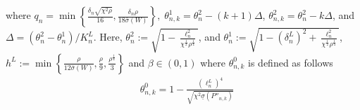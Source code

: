 \documentclass[Afour,sageh,times]{sagej}
\begin{document}
where $q_n=\min\left\{\frac{\delta_n\sqrt{ \chi^2 \rho} }{16},\frac{\delta_n\rho }{18\bar{\sigma}(W)}\right\},\;\theta^1_{n,k}=\theta^2_n-(k+1)\Delta$, $\theta^2_{n,k}=\theta^2_n-k\Delta$, and $\Delta=(\theta^2_n-\theta^1_n)/K^L_n$. Here, $\theta^2_{n}:=\sqrt{{1}-\frac{\ell^2_n}{\chi^{\frac{1}{2}}\rho^{\frac{1}{4}}}}$, and $\theta^1_{n}:=\sqrt{1-(\delta^L_n)^2+\frac{\ell^2_n}{\chi^{\frac{1}{2}}\rho^{\frac{1}{4}}}}$, $h^L:=\min\left\{\frac{\rho}{12\bar{\sigma}(W)},\frac{\rho}{9}, \frac{\rho^{\frac{1}{4}}}{3}\right\}$ and $\beta\in(0,1)$ where $\theta^0_{n,k}$ is defined as follows
\begin{align}
   & \theta_{n,k}^{0}= 1- \frac{(\ell^L_n)^4}{\sqrt{\chi^2\underline{\sigma}(P''_{n,k})}}\nonumber   
\end{align}
\end{document}
